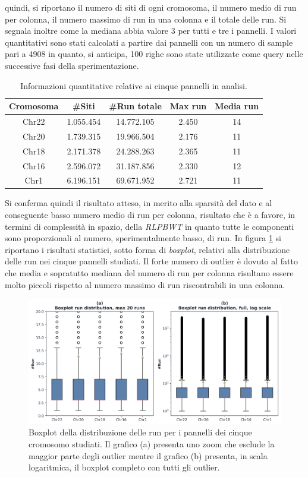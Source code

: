   quindi, si riportano il numero di siti di ogni cromosoma, il 
numero medio di run per colonna, il numero 
massimo di run in una colonna e il totale delle run. Si segnala inoltre come la
mediana abbia valore 3 per tutti e tre i pannelli. I valori quantitativi sono
stati calcolati a partire dai pannelli con un numero di sample pari a 4908 in
quanto, si anticipa, 100 righe sono state utilizzate come query nelle successive
fasi della sperimentazione.
\begin{table}
  \centering
  \caption{Informazioni quantitative relative ai cinque pannelli in analisi.}
  \label{tab:panel}
  \begin{tabular}{c||c|c|c|c}
    \textbf{Cromosoma} & \textbf{\#Siti} & \textbf{\#Run totale}
    & \textbf{Max run} & \textbf{Media run} \\ 
    \hline
    Chr22 & 1.055.454 & 14.772.105 & 2.450 & 14\\
    Chr20 & 1.739.315 & 19.966.504 & 2.176 & 11\\
    Chr18 & 2.171.378 & 24.288.263 & 2.365 & 11\\
    Chr16 & 2.596.072 & 31.187.856 & 2.330 & 12\\
    Chr1 & 6.196.151 & 69.671.952 & 2.721 & 11\\
  \end{tabular}
\end{table}
Si conferma quindi il risultato atteso, in merito alla sparsità del dato e al
conseguente basso numero medio di run per colonna, risultato che è a favore, in
termini di 
complessità in spazio, della \textit{RLPBWT} in quanto tutte le componenti sono
proporzionali al numero, sperimentalmente basso, di run. In figura
\ref{fig:boxplot} si riportano i risultati statistici, sotto forma di
\textit{boxplot}, relativi alla distribuzione delle run nei cinque pannelli
studiati. Il forte numero di outlier è dovuto al fatto che media e sopratutto
mediana del numero di run per colonna risultano essere molto piccoli rispetto al
numero massimo di run riscontrabili in una colonna.
\begin{figure}
  \centering
  \includegraphics[width = \linewidth]{img/boxplotbi.png}
  \caption{Boxplot della distribuzione delle run per i pannelli dei cinque
    cromosomo studiati. Il grafico (a) presenta uno zoom che esclude la maggior
    parte degli outlier mentre il grafico (b) presenta, in scala logaritmica, il
    boxplot completo con tutti gli outlier.}
  \label{fig:boxplot}
\end{figure}
